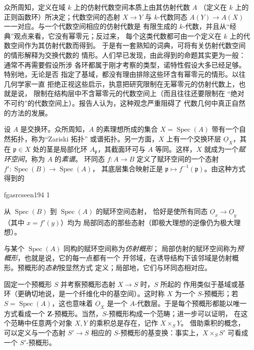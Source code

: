 \documentclass[12pt,twoside,openany]{book}
\numberwithin{equation}{section}
\newcommand{\fgaunitid}{unbound}
\newcommand{\src}[1]{%
  \phantomsection
  \hypertarget{src:\fgaunitid:#1}{}%
  \hypertarget{fga.\fgaunitid.p#1}{}%
  \ifcsname fgasrcseen#1\endcsname\else
    \expandafter\gdef\csname fgasrcseen#1\endcsname{1}%
    \hypertarget{src:#1}{}%
  \fi
  \marginpar{\raggedleft\footnotesize\sffamily #1}%
}
\newcommand{\Osh}{\underline{O}}
\newcommand{\fquote}[1]{“#1”}
\theoremstyle{plain}
\theoremstyle{definition}
\theoremstyle{remark}
\begin{document}
众所周知，定义在域 $k$ 上的仿射代数空间本质上由其仿射代数 $A$
（定义在 $k$ 上的正则函数环）所决定；代数空间的态射
$X\longrightarrow Y$ 与 $k$-代数同态
$A(Y)\longrightarrow A(X)$ 一一对应。与一个代数空间相应的仿射代数是
有限生成的 $k$-代数，并且从\fquote{经典}观点来看，它没有幂零元；反过来，
每个这类代数都可由一个定义在 $k$ 上的代数空间作为其仿射代数而得到。
于是有一套熟知的词典，可将有关仿射代数空间的情形解释为交换代数的
情形。人们早已发现，由此得到的命题其实更为一般：通常不再需要假设所涉
各环都属于刚才考察的类型，诺特性假设大多已经足够。特别地，无论是否
指定了基域，都没有理由排除这些环含有幂零元的情形。以往几何学家一直
拒绝正视这些启示，执意把研究限制在无幂零元的仿射代数上，也就是说，
限制在结构层中不含幂零元的代数空间上（而且往往还要限制在
\fquote{绝对不可约}的代数空间上）。报告人认为，这种观念严重阻碍了
代数几何中真正自然的方法的发展。

设 $A$ 是交换环。众所周知，$A$ 的素理想所成的集合
$X=\operatorname{Spec}(A)$ 带有一个自然拓扑，称为\fquote{Zariski 拓扑}
或谱拓扑。另一方面，$X$ 上有一个交换环层 $\Osh_X$，其在
$\mathfrak p\in X$ 处的茎是局部化环 $A_{\mathfrak p}$，其截面环可与 $A$
等同。这样，$X$ 就成为一个\emph{赋环空间}，称为 $A$ 的\emph{素谱}。
环同态 $f:A\longrightarrow B$ 定义了赋环空间的一个态射
$f':\operatorname{Spec}(B)\longrightarrow\operatorname{Spec}(A)$，
其底层集合映射正是
$\mathfrak p\longmapsto f^{-1}(\mathfrak p)$。由这种方式得到的

\src{194}
从 $\operatorname{Spec}(B)$ 到 $\operatorname{Spec}(A)$ 的赋环空间态射，
恰好是使所有同态 $\Osh_x\longrightarrow\Osh_y$（其中 $x=f'(y)$）均为
局部同态的那些态射（即极大理想的逆像仍为极大理想）。

与某个 $\operatorname{Spec}(A)$ 同构的赋环空间称为\emph{仿射概形}；
局部仿射的赋环空间称为\emph{预概形}，也就是说，它的每一点都有一个
开邻域，在诱导结构下该邻域是仿射概形。预概形的\emph{态射}按显然方式
定义；局部地，它们与环同态相对应。

固定一个预概形 $S$ 并考察预概形态射 $X\longrightarrow S$ 时，$S$ 所起的
作用类似于基域或基环（更确切地说，是一个纤维化中的基空间）。这时称
$X$ 为一个 $S$-预概形；若 $S=\operatorname{Spec}(A)$，这也意味着
$\Osh_X$ 是一个 $A$-代数层。于是每个预概形都能以唯一方式看成一个
$\mathbf Z$-预概形。当然，$S$-预概形构成一个范畴；进一步可以证明，
在这个范畴中任意两个对象 $X,Y$ 的乘积总是存在，记作 $X\times_S Y$。
借助乘积的概念，可以定义与一个态射 $S'\longrightarrow S$ 相应的
$S$-预概形的基变换：事实上，$X\times_S S'$ 可看成一个 $S'$-预概形。
\end{document}
